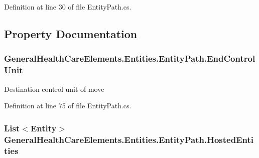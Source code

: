Definition at line 30 of file Entity\+Path.\+cs.



\subsection{Property Documentation}
\subsubsection[{\texorpdfstring{End\+Control\+Unit}{EndControlUnit}}]{ General\+Health\+Care\+Elements.\+Entities.\+Entity\+Path.\+End\+Control\+Unit\hspace{0.3cm}{\ttfamily [get]}}\hypertarget{class_general_health_care_elements_1_1_entities_1_1_entity_path_aed9943faa43bed13e3ad3314fd509d37}{}\label{class_general_health_care_elements_1_1_entities_1_1_entity_path_aed9943faa43bed13e3ad3314fd509d37}


Destination control unit of move 



Definition at line 75 of file Entity\+Path.\+cs.

\subsubsection[{\texorpdfstring{Hosted\+Entities}{HostedEntities}}]{\setlength{\rightskip}{0pt plus 5cm}List$<${\bf Entity}$>$ General\+Health\+Care\+Elements.\+Entities.\+Entity\+Path.\+Hosted\+Entities\hspace{0.3cm}{\ttfamily [get]}}\hypertarget{class_general_health_care_elements_1_1_entities_1_1_entity_path_a85f4fd8f52bbd223fad8e83cb1532ff7}{}\label{class_general_health_care_elements_1_1_entities_1_1_entity_path_a85f4fd8f52bbd223fad8e83cb1532ff7}


